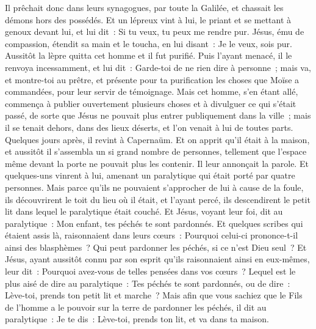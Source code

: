\begin{multicols}{2}
Il prêchait donc dans leurs synagogues, par toute la Galilée, et chassait les démons hors des possédés.
Et un lépreux vint à lui, le priant et se mettant à genoux devant lui, et lui dit~: Si tu veux, tu peux me rendre pur.
Jésus, ému de compassion, étendit sa main et le toucha, en lui disant~: Je le veux, sois pur.
Aussitôt la lèpre quitta cet homme et il fut purifié.
Puis l'ayant menacé, il le renvoya incessamment,
et lui dit~: Garde-toi de ne rien dire à personne~; mais va, et montre-toi au prêtre, et présente pour ta purification les choses que Moïse a commandées, pour leur servir de témoignage.
Mais cet homme, s'en étant allé, commença à publier ouvertement plusieurs choses et à divulguer ce qui s'était passé, de sorte que Jésus ne pouvait plus entrer publiquement dans la ville~; mais il se tenait dehors, dans des lieux déserts, et l'on venait à lui de toutes parts.
\VerseOne{}Quelques jours après, il revint à Capernaüm. Et on apprit qu'il était à la maison,
et aussitôt il s'assembla un si grand nombre de personnes, tellement que l'espace même devant la porte ne pouvait plus les contenir. Il leur annonçait la parole.
Et quelques-uns vinrent à lui, amenant un paralytique qui était porté par quatre personnes.
Mais parce qu'ils ne pouvaient s'approcher de lui à cause de la foule, ils découvrirent le toit du lieu où il était, et l'ayant percé, ils descendirent le petit lit dans lequel le paralytique était couché.
Et Jésus, voyant leur foi, dit au paralytique~: Mon enfant, tes péchés te sont pardonnés.
Et quelques scribes qui étaient assis là, raisonnaient dans leurs cœurs~:
Pourquoi celui-ci prononce-t-il ainsi des blasphèmes~? Qui peut pardonner les péchés, si ce n'est Dieu seul~?
Et Jésus, ayant aussitôt connu par son esprit qu'ils raisonnaient ainsi en eux-mêmes, leur dit~: Pourquoi avez-vous de telles pensées dans vos cœurs~?
Lequel est le plus aisé de dire au paralytique~: Tes péchés te sont pardonnés, ou de dire~: Lève-toi, prends ton petit lit et marche~?
Mais afin que vous sachiez que le Fils de l'homme a le pouvoir sur la terre de pardonner les péchés, il dit au paralytique~:
Je te dis~: Lève-toi, prends ton lit, et va dans ta maison.

\end{multicols}
